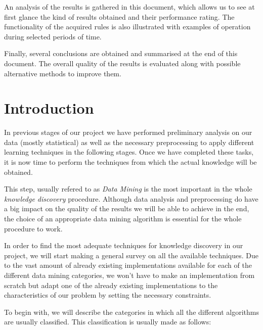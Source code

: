 \documentclass[a4paper,12pt]{article}
\begin{document}
An analysis of the results is gathered in this document, which allows us to see at first glance the kind of results obtained and their performance rating. The functionality of the acquired rules is also illustrated with examples of operation during selected periods of time.

Finally, several conclusions are obtained and summarised at the end of this document. The overall quality of the results is evaluated along with possible alternative methods to improve them. 

\newpage
\tableofcontents %
\cleardoublepage
{} %
\listoffigures %

\cleardoublepage
{} %
\listoftables %
\cleardoublepage

\setcounter{page}{1}
\section{Introduction}
\label{sec:datamining}
In previous stages of our project we have performed preliminary analysis on our data (mostly statistical) as well as the necessary preprocessing to apply different learning techniques in the following stages. Once we have completed these tasks, it is now time to perform the techniques from which the actual knowledge will be obtained.

This step, usually refered to as \emph{Data Mining} is the most important in the whole \emph{knowledge discovery} procedure. Although data analysis and preprocessing do have a big impact on the quality of the results we will be able to achieve in the end, the choice of an appropriate data mining algorithm is essential for the whole procedure to work.

In order to find the most adequate techniques for knowledge discovery in our project, we will start making a general survey on all the available techniques. Due to the vast amount of already existing implementations available for each of the different data mining categories, we won't have to make an implementation from scratch but adapt one of the already existing implementations to the characteristics of our problem by setting the necessary constraints.

To begin with, we will describe the categories in which all the different algorithms are usually classified. This classification is usually made as follows:
\end{document}
